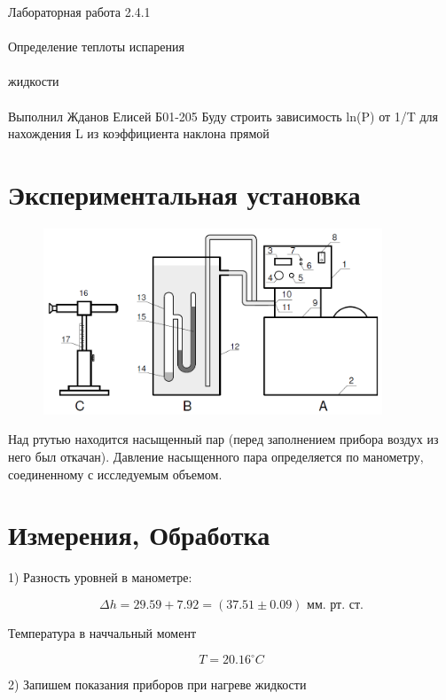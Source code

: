 \documentclass{astroedu-lab}
\begin{document}
\begin{problem}{\huge Лабораторная работа 2.4.1\\\\Определение теплоты испарения\\\\жидкости\\\\Выполнил Жданов Елисей Б01-205}
Буду строить зависимость ln(P) от 1/T для нахождения L из коэффициента наклона прямой

\section{Экспериментальная установка}

\begin{figure}[!h]
	\centering
	\includegraphics[width=0.9\textwidth]{установка.png}
	\label{fig:boiler}
\end{figure}

Над ртутью находится насыщенный пар (перед заполнением прибора воздух из него был откачан). Давление насыщенного пара определяется по манометру, соединенному с исследуемым объемом.

\section{Измерения, Обработка}

1) Разность уровней в манометре:

\begin{equation}
	\Delta h = 29.59 + 7.92 = (37.51 \pm 0.09) \text{ мм. рт. ст.}
\end{equation}

Температура в наччальный момент

\begin{equation}
	T = 20.16 ^\circ C
\end{equation}

2) Запишем показания приборов при нагреве жидкости


\end{problem}
\end{document}
